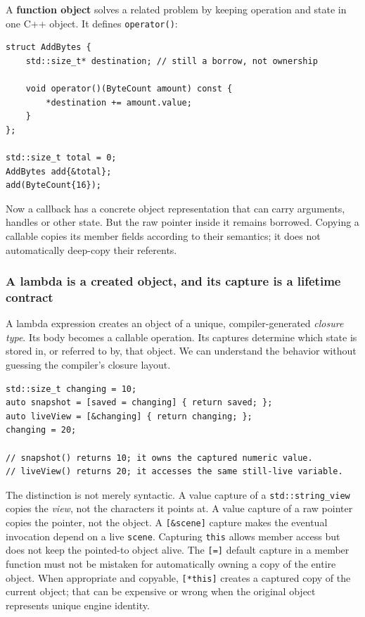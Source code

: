 A \textbf{function object} solves a related problem by keeping operation and state in one C++ object. It defines \texttt{operator()}:

\begin{verbatim}
struct AddBytes {
    std::size_t* destination; // still a borrow, not ownership

    void operator()(ByteCount amount) const {
        *destination += amount.value;
    }
};

std::size_t total = 0;
AddBytes add{&total};
add(ByteCount{16});
\end{verbatim}

Now a callback has a concrete object representation that can carry arguments, handles or other state. But the raw pointer inside it remains borrowed. Copying a callable copies its member fields according to their semantics; it does not automatically deep-copy their referents.

\subsubsection{A lambda is a created object, and its capture is a lifetime contract}\label{a-lambda-is-a-created-object-and-its-capture-is-a-lifetime-contract}

A lambda expression creates an object of a unique, compiler-generated \emph{closure type}. Its body becomes a callable operation. Its captures determine which state is stored in, or referred to by, that object. We can understand the behavior without guessing the compiler's closure layout.

\begin{verbatim}
std::size_t changing = 10;
auto snapshot = [saved = changing] { return saved; };
auto liveView = [&changing] { return changing; };
changing = 20;

// snapshot() returns 10; it owns the captured numeric value.
// liveView() returns 20; it accesses the same still-live variable.
\end{verbatim}

The distinction is not merely syntactic. A value capture of a \texttt{std::string\_view} copies the \emph{view}, not the characters it points at. A value capture of a raw pointer copies the pointer, not the object. A \texttt{{[}\&scene{]}} capture makes the eventual invocation depend on a live \texttt{scene}. Capturing \texttt{this} allows member access but does not keep the pointed-to object alive. The \texttt{{[}={]}} default capture in a member function must not be mistaken for automatically owning a copy of the entire object. When appropriate and copyable, \texttt{{[}*this{]}} creates a captured copy of the current object; that can be expensive or wrong when the original object represents unique engine identity.


